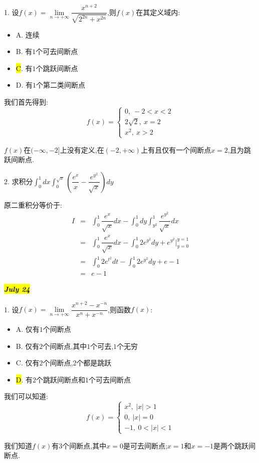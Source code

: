 1. 设$f(x)=\lim\limits_{n\rightarrow+\infty}\dfrac{x^{n+2}}{\sqrt{2^{2n}+x^{2n}}}$,则$f(x)$在其定义域内: 
\begin{itemize}
	\item A. 连续
	\item B. 有$1$个可去间断点
	\item \hl{C}. 有$1$个跳跃间断点
	\item D. 有$1$个第二类间断点
\end{itemize}
\begin{solution}
	
	我们首先得到: 
	$$f(x)=\left\lbrace
	\begin{array}{l}
		0,\ -2<x<2\\ 2\sqrt{2},\ x=2\\x^2,\ x>2
	\end{array}
	\right. $$
	
	$f(x)$在$(-\infty,-2]$上没有定义,在$(-2,+\infty)$上有且仅有一个间断点$x=2$,且为跳跃间断点.
\end{solution}

2. 求积分$\int_{0}^{1}dx\int_{0}^{\sqrt{x}}(\dfrac{e^x}{x}-\dfrac{e^{y^2}}{\sqrt{x}})dy$
\begin{solution}
	
	原二重积分等价于: 
	\begin{eqnarray*}
		I&=&\int_{0}^{1}\dfrac{e^x}{\sqrt{x}}dx-\int_{0}^{1}dy\int_{y^2}^{1}\dfrac{e^{y^2}}{\sqrt{x}}dx\\
		&=&\int_{0}^{1}\dfrac{e^x}{\sqrt{x}}dx-\int_{0}^{1}2e^{y^2}dy+e^{y^2}|_{y=0}^{y=1}\\
		&=&\int_{0}^{1}2e^{t^2}dt-\int_{0}^{1}2e^{y^2}dy+e-1\\
		&=&e-1
	\end{eqnarray*}
\end{solution}
\hl{\textbf{\textit{July 24}}}

1. 设$f(x)=\lim\limits_{n\rightarrow +\infty}\dfrac{x^{n+2}-x^{-n}}{x^n+x^{-n}}$,则函数$f(x)$: 
\begin{itemize}
	\item A. 仅有$1$个间断点
	\item B. 仅有$2$个间断点,其中$1$个可去,$1$个无穷
	\item C. 仅有$2$个间断点,$2$个都是跳跃
	\item \hl{D}. 有$2$个跳跃间断点和$1$个可去间断点
\end{itemize}
\begin{solution}
	
	我们可以知道: 
	$$f(x)=\left\lbrace
	\begin{array}{l}
		x^2,\ |x|>1\\
		0, \ |x|=0\\
		-1,\ 0<|x|<1
	\end{array}
	\right. $$
	
	我们知道$f(x)$有$3$个间断点,其中$x=0$是可去间断点;$x=1$和$x=-1$是两个跳跃间断点.
\end{solution}

